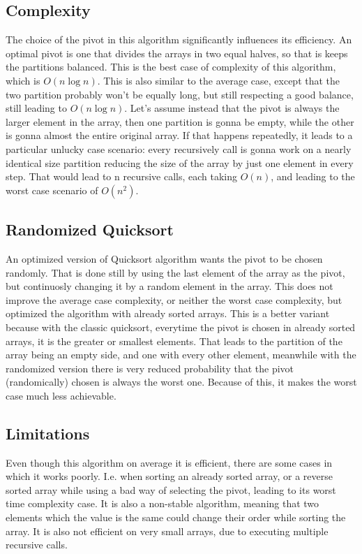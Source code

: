 \begin{multicols}{2}
\subsection{Complexity}
The choice of the pivot in this algorithm significantly influences its efficiency. An optimal pivot is one that divides the arrays in two equal halves, so that is keeps the partitions balanced. This is the best case of complexity of this algorithm, which is $O(n \log n)$. This is also similar to the average case, except that the two partition probably won't be equally long, but still respecting a good balance, still leading to $O(n \log n)$.
Let's assume instead that the pivot is always the larger element in the array, then one partition is gonna be empty, while the other is gonna almost the entire original array. If that happens repeatedly, it leads to a particular unlucky case scenario: every recursively call is gonna work on a nearly identical size partition reducing the size of the array by just one element in every step.
That would lead to n recursive calls, each taking $O(n)$, and leading to the worst case scenario of $O(n^2)$.


\subsection{Randomized Quicksort}
An optimized version of Quicksort algorithm wants the pivot to be chosen randomly. That is done still by using the last element of the array as the pivot, but continuosly changing it by a random element in the array. This does not improve the average case complexity, or neither the worst case complexity, but optimized the algorithm with already sorted arrays. This is a better variant because with the classic quicksort, everytime the pivot is chosen in already sorted arrays, it is the greater or smallest elements. That leads to the partition of the array being an empty side, and one with every other element, meanwhile with the randomized version there is very reduced probability that the pivot (randomically) chosen is always the worst one. Because of this, it makes the worst case much less achievable.

\subsection{Limitations}
Even though  this algorithm on average it is efficient, there are some cases in which it works poorly. I.e. when sorting an already sorted array, or a reverse sorted array while using a bad way of selecting the pivot, leading to its worst time complexity case. It is also a non-stable algorithm, meaning that two elements which the value is the same could change their order while sorting the array. It is also not efficient on very small arrays, due to executing multiple recursive calls.

\end{multicols}